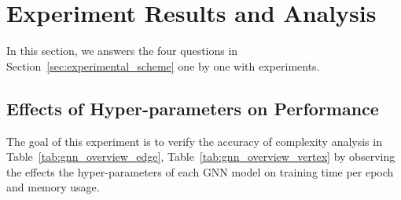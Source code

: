 \section{Experiment Results and Analysis}
\label{sec:experiment_results}

In this section, we answers the four questions in Section~\ref{sec:experimental_scheme} one by one with experiments.

\subsection{Effects of Hyper-parameters on Performance}
\label{sec:effects_of_hyper-parameters_on_performance}

The goal of this experiment is to verify the accuracy of complexity analysis in Table~\ref{tab:gnn_overview_edge}, Table~\ref{tab:gnn_overview_vertex} 
by observing the effects the hyper-parameters of each GNN model on training time per epoch and memory usage.


